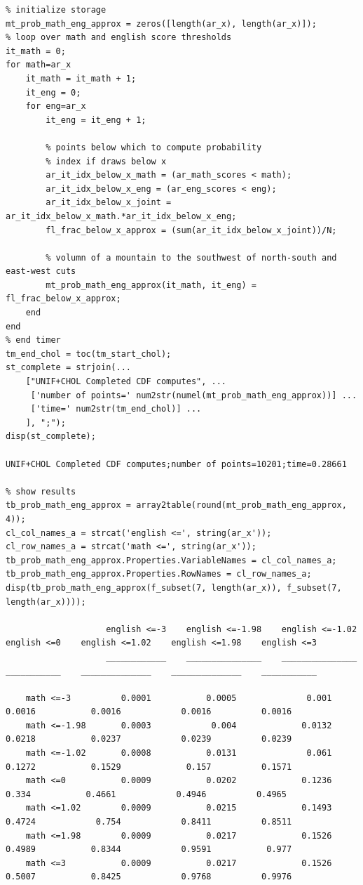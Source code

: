 \documentclass[
]{book}
\begin{document}
\begin{verbatim}
% initialize storage
mt_prob_math_eng_approx = zeros([length(ar_x), length(ar_x)]);
% loop over math and english score thresholds
it_math = 0;
for math=ar_x
    it_math = it_math + 1;
    it_eng = 0;
    for eng=ar_x
        it_eng = it_eng + 1;
        
        % points below which to compute probability 
        % index if draws below x
        ar_it_idx_below_x_math = (ar_math_scores < math);
        ar_it_idx_below_x_eng = (ar_eng_scores < eng);
        ar_it_idx_below_x_joint = ar_it_idx_below_x_math.*ar_it_idx_below_x_eng;
        fl_frac_below_x_approx = (sum(ar_it_idx_below_x_joint))/N;
        
        % volumn of a mountain to the southwest of north-south and east-west cuts
        mt_prob_math_eng_approx(it_math, it_eng) = fl_frac_below_x_approx;
    end
end
% end timer
tm_end_chol = toc(tm_start_chol);
st_complete = strjoin(...
    ["UNIF+CHOL Completed CDF computes", ...
     ['number of points=' num2str(numel(mt_prob_math_eng_approx))] ...
     ['time=' num2str(tm_end_chol)] ...
    ], ";");
disp(st_complete);

UNIF+CHOL Completed CDF computes;number of points=10201;time=0.28661

% show results
tb_prob_math_eng_approx = array2table(round(mt_prob_math_eng_approx, 4));
cl_col_names_a = strcat('english <=', string(ar_x'));
cl_row_names_a = strcat('math <=', string(ar_x'));
tb_prob_math_eng_approx.Properties.VariableNames = cl_col_names_a;
tb_prob_math_eng_approx.Properties.RowNames = cl_row_names_a;
disp(tb_prob_math_eng_approx(f_subset(7, length(ar_x)), f_subset(7, length(ar_x))));

                    english <=-3    english <=-1.98    english <=-1.02    english <=0    english <=1.02    english <=1.98    english <=3
                    ____________    _______________    _______________    ___________    ______________    ______________    ___________

    math <=-3          0.0001           0.0005              0.001           0.0016           0.0016            0.0016          0.0016   
    math <=-1.98       0.0003            0.004             0.0132           0.0218           0.0237            0.0239          0.0239   
    math <=-1.02       0.0008           0.0131              0.061           0.1272           0.1529             0.157          0.1571   
    math <=0           0.0009           0.0202             0.1236            0.334           0.4661            0.4946          0.4965   
    math <=1.02        0.0009           0.0215             0.1493           0.4724            0.754            0.8411          0.8511   
    math <=1.98        0.0009           0.0217             0.1526           0.4989           0.8344            0.9591           0.977   
    math <=3           0.0009           0.0217             0.1526           0.5007           0.8425            0.9768          0.9976
\end{verbatim}
\end{document}
